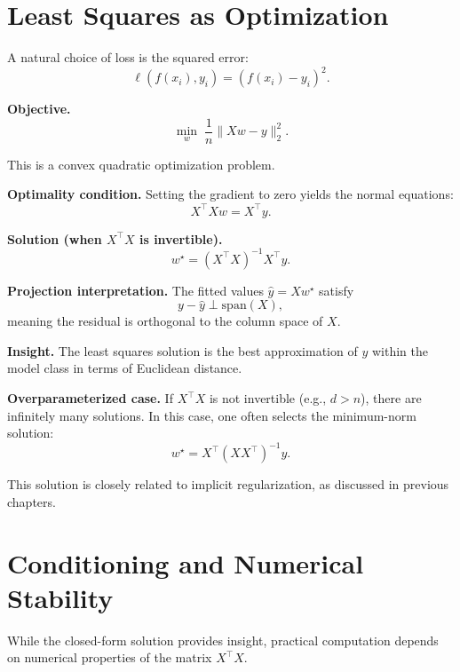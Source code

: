 \section{Least Squares as Optimization}

A natural choice of loss is the squared error:
\[
\ell(f(x_i), y_i) = (f(x_i) - y_i)^2.
\]

\medskip

\noindent
\textbf{Objective.}
\[
\min_{w} \; \frac{1}{n} \|Xw - y\|_2^2.
\]

\medskip

\noindent
This is a convex quadratic optimization problem.

\medskip

\noindent
\textbf{Optimality condition.}  
Setting the gradient to zero yields the normal equations:
\[
X^\top X w = X^\top y.
\]

\medskip

\noindent
\textbf{Solution (when $X^\top X$ is invertible).}
\[
w^\star = (X^\top X)^{-1} X^\top y.
\]

\medskip

\noindent
\textbf{Projection interpretation.}  
The fitted values $\hat{y} = X w^\star$ satisfy
\[
y - \hat{y} \perp \mathrm{span}(X),
\]
meaning the residual is orthogonal to the column space of $X$.

\medskip

\noindent
\textbf{Insight.}  
The least squares solution is the best approximation of $y$ within the model class in terms of Euclidean distance.

\medskip

\noindent
\textbf{Overparameterized case.}  
If $X^\top X$ is not invertible (e.g., $d > n$), there are infinitely many solutions. In this case, one often selects the minimum-norm solution:
\[
w^\star = X^\top (X X^\top)^{-1} y.
\]

\medskip

\noindent
This solution is closely related to implicit regularization, as discussed in previous chapters.

\section{Conditioning and Numerical Stability}

While the closed-form solution provides insight, practical computation depends on numerical properties of the matrix $X^\top X$.

\medskip

